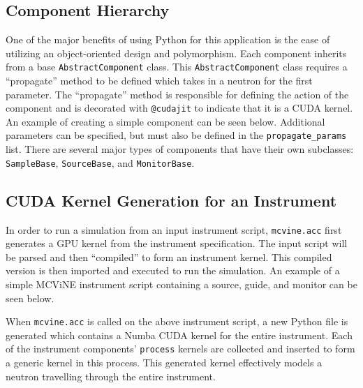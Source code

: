\subsection{Component Hierarchy}

One of the major benefits of using Python for this application is the ease of utilizing an object-oriented design and polymorphism.
Each component inherits from a base \texttt{AbstractComponent} class. This \texttt{AbstractComponent} class requires a ``propagate'' method to be defined which takes in a neutron for the first parameter. The ``propagate'' method is responsible for defining the action of the component and is decorated with \texttt{@cudajit} to indicate that it is a CUDA kernel. An example of creating a simple component can be seen below. Additional parameters can be specified, but must also be defined in the \texttt{propagate\_params} list.
There are several major types of components that have their own subclasses: \texttt{SampleBase}, \texttt{SourceBase}, and \texttt{MonitorBase}.

\vspace{1mm}


\subsection{CUDA Kernel Generation for an Instrument}

In order to run a simulation from an input instrument script, \texttt{mcvine.acc} first generates a GPU kernel from the instrument specification. The input script will be parsed and then ``compiled'' to form an instrument kernel. This compiled version is then imported and executed to run the simulation. An example of a simple MCViNE instrument script containing a source, guide, and monitor can be seen below.

\vspace{1mm}

\vspace{1mm}

When \texttt{mcvine.acc} is called on the above instrument script, a new Python file is generated which contains a Numba CUDA kernel for the entire instrument. Each of the instrument components' \texttt{process} kernels are collected and inserted to form a generic kernel in this process. This generated kernel effectively models a neutron travelling through the entire instrument.


